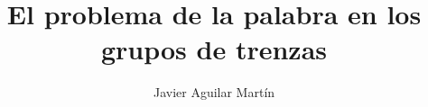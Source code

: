 \documentclass{beamer}
\title{El problema de la palabra en los grupos de trenzas}
\author{Javier Aguilar Martín}
\institute{Universidad de Sevilla}
\date{}
\theoremstyle{definition}
\begin{document}
\frame{\titlepage}
%
%
% 
% 
% 
% 



\newcommand{\seti}{\setcounter{saveenumi}{\value{enumi}}}
\newcommand{\conti}{\setcounter{enumi}{\value{saveenumi}}}
\end{document}
